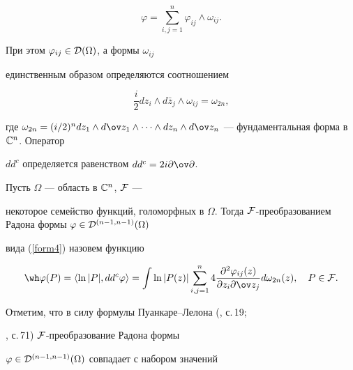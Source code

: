\begin{equation}\label{form4}


\varphi=\sum\limits_{i,j=1}^n\varphi_{ij}\wedge\omega_{ij}.


\end{equation}


При этом $\varphi_{ij}\in{\cal D}(\Omega)$, а формы $\omega_{ij}$ 


единственным образом определяются соотношением


$$


\frac i2dz_i\wedge d\bar z_j\wedge\omega_{ij}=\omega_{2n},


$$


где $\omega_{2n}=(i/2)^ndz_1\wedge d\ov z_1\wedge\dotsb\wedge


dz_n\wedge d\ov z_n$ --- фундаментальная форма в $\Bbb C^n$. Оператор 


$dd^c$ определяется равенством $dd^c=2i\partial\ov\partial$. 





\begin{defnnonum}


Пусть $\Omega$ --- область в $\Bbb C^n$, $\cal F$ --- 


некоторое семейство функций, голоморфных в $\Omega$. Тогда $\cal 


F$-преобразованием Радона формы $\varphi\in{\cal D}^{(n-1,n-1)}(\Omega)$


вида (\ref{form4}) назовем функцию 


\begin{equation}\label{form5}


\wh\varphi(P)=\langle\ln|P|, dd^c\varphi\rangle=\int\ln|P(z)|\sum


\limits_{i,j=1}^n4\frac{\partial^2\varphi_{ij}(z)}{\partial z_i\partial 


\ov z_j}d\omega_{2n}(z), \quad P\in {\cal F}.


\end{equation}


\end{defnnonum}





Отметим, что в силу формулы Пуанкаре--Лелона (\cite{Harvi}, с.\,19;


\cite{Shabat}, с.\,71) $\cal F$-преобразование Радона формы 


$\varphi\in{\cal D}^{(n-1,n-1)}(\Omega)$ совпадает с набором значений


